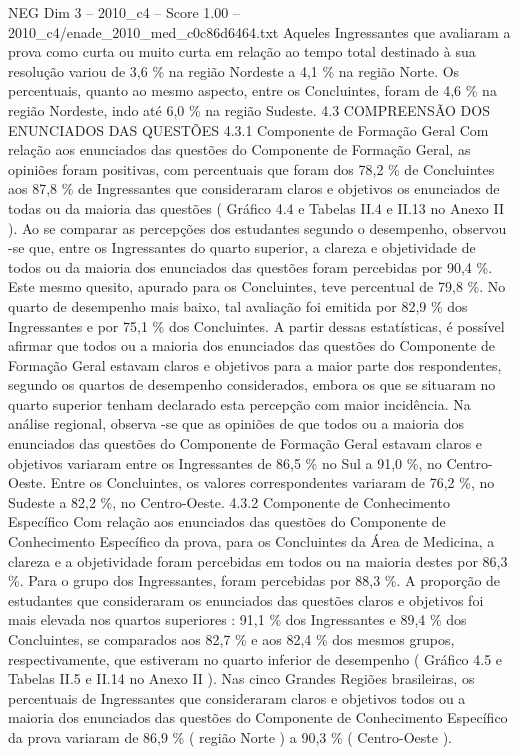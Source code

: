 \begin{textsample}{NEG Dim 3 – 2010\_c4 – Score 1.00 – 2010\_c4/enade\_2010\_med\_c0c86d6464.txt}
Aqueles Ingressantes que avaliaram a prova como curta ou muito curta em relação ao tempo total destinado à sua resolução variou de 3,6 \% na região Nordeste a 4,1 \% na região Norte.
Os percentuais, quanto ao mesmo aspecto, entre os Concluintes, foram de 4,6 \% na região Nordeste, indo até 6,0 \% na região Sudeste. 4.3 COMPREENSÃO DOS ENUNCIADOS DAS QUESTÕES 4.3.1 Componente de Formação Geral Com relação aos enunciados das questões do Componente de Formação Geral, as opiniões foram positivas, com percentuais que foram dos 78,2 \% de Concluintes aos 87,8 \% de Ingressantes que consideraram claros e objetivos os enunciados de todas ou da maioria das questões ( Gráfico 4.4 e Tabelas II.4 e II.13 no Anexo II ).
Ao se comparar as percepções dos estudantes segundo o desempenho, observou -se que, entre os Ingressantes do quarto superior, a clareza e objetividade de todos ou da maioria dos enunciados das questões foram percebidas por 90,4 \%.
Este mesmo quesito, apurado para os Concluintes, teve percentual de 79,8 \%.
No quarto de desempenho mais baixo, tal avaliação foi emitida por 82,9 \% dos Ingressantes e por 75,1 \% dos Concluintes.
A partir dessas estatísticas, é possível afirmar que todos ou a maioria dos enunciados das questões do Componente de Formação Geral estavam claros e objetivos para a maior parte dos respondentes, segundo os quartos de desempenho considerados, embora os que se situaram no quarto superior tenham declarado esta percepção com maior incidência.
Na análise regional, observa -se que as opiniões de que todos ou a maioria dos enunciados das questões do Componente de Formação Geral estavam claros e objetivos variaram entre os Ingressantes de 86,5 \% no Sul a 91,0 \%, no Centro-Oeste.
Entre os Concluintes, os valores correspondentes variaram de 76,2 \%, no Sudeste a 82,2 \%, no Centro-Oeste. 4.3.2 Componente de Conhecimento Específico Com relação aos enunciados das questões do Componente de Conhecimento Específico da prova, para os Concluintes da Área de Medicina, a clareza e a objetividade foram percebidas em todos ou na maioria destes por 86,3 \%.
Para o grupo dos Ingressantes, foram percebidas por 88,3 \%.
A proporção de estudantes que consideraram os enunciados das questões claros e objetivos foi mais elevada nos quartos superiores : 91,1 \% dos Ingressantes e 89,4 \% dos Concluintes, se comparados aos 82,7 \% e aos 82,4 \% dos mesmos grupos, respectivamente, que estiveram no quarto inferior de desempenho ( Gráfico 4.5 e Tabelas II.5 e II.14 no Anexo II ).
Nas cinco Grandes Regiões brasileiras, os percentuais de Ingressantes que consideraram claros e objetivos todos ou a maioria dos enunciados das questões do Componente de Conhecimento Específico da prova variaram de 86,9 \% ( região Norte ) a 90,3 \% ( Centro-Oeste ).

\end{textsample}
